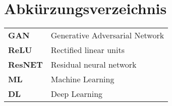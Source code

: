 
\chapter*{Abkürzungsverzeichnis}
\begin{longtable}{ll}
\textbf{GAN}  & Generative Adversarial Network \\ 
\textbf{ReLU} & Rectified linear units\\
\textbf{ResNET} & Residual neural network\\
\textbf{ML} & Machine Learning\\
\textbf{DL} & Deep Learning
\end{longtable}

\cleardoublepage